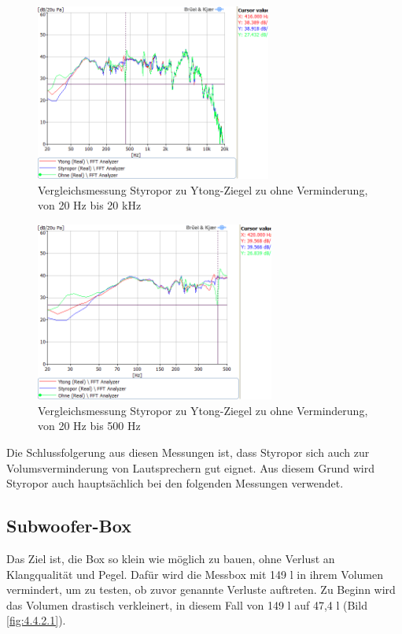 \begin{figure} [H]
	\centering
	\includegraphics[width=0.69\textwidth]{img/Optimierung/Vergleich/VergleichYtognStyroOhne_full.png}
	\caption{Vergleichsmessung Styropor zu Ytong-Ziegel zu ohne Verminderung, von 20 Hz bis 20 kHz}
	\label{fig:4.4.1.5}
\end{figure}\begin{figure} [H]
	\centering
	\includegraphics[width=0.7\textwidth]{img/Optimierung/Vergleich/VergleichYtognStyroOhne_500Hz.png}
	\caption{Vergleichsmessung Styropor zu Ytong-Ziegel zu ohne Verminderung, von 20 Hz bis 500 Hz}
	\label{fig:4.4.1.6}
\end{figure}

Die Schlussfolgerung aus diesen Messungen ist, dass Styropor sich auch zur Volumsverminderung von Lautsprechern gut eignet.
Aus diesem Grund wird Styropor auch hauptsächlich bei den folgenden Messungen verwendet.

\newpage
\subsection{Subwoofer-Box}\label{subsec:4.4.2}
Das Ziel ist, die Box so klein wie möglich zu bauen, ohne Verlust an Klangqualität und Pegel.
Dafür wird die Messbox mit 149 l in ihrem Volumen vermindert, um zu testen, ob zuvor genannte Verluste auftreten.
Zu Beginn wird das Volumen drastisch verkleinert, in diesem Fall von 149 l auf 47,4 l (Bild \ref{fig:4.4.2.1}).

